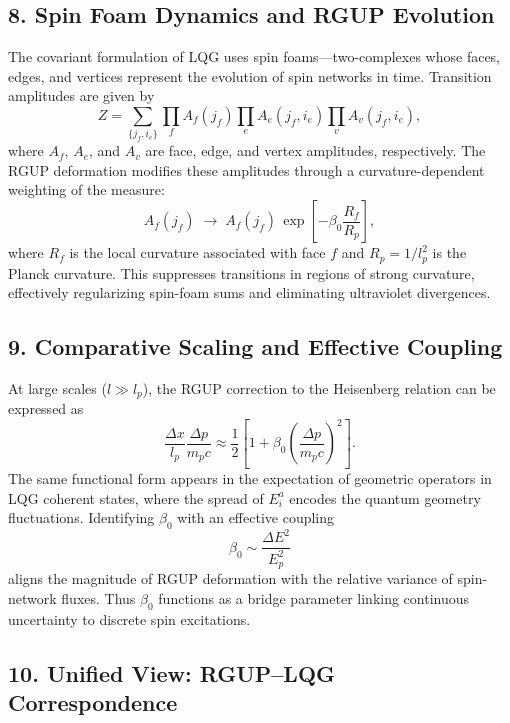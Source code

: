 \documentclass[11pt,oneside]{book}
\numberwithin{equation}{chapter}
\begin{document}
\subsection*{8. Spin Foam Dynamics and RGUP Evolution}

The covariant formulation of LQG uses spin foams—two-complexes whose faces, edges, and vertices represent the evolution of spin networks in time.  
Transition amplitudes are given by
\begin{equation}
Z = \sum_{\{j_f, i_e\}}
\prod_f A_f(j_f)
\prod_e A_e(j_f,i_e)
\prod_v A_v(j_f,i_e),
\end{equation}
where $A_f$, $A_e$, and $A_v$ are face, edge, and vertex amplitudes, respectively.  
The RGUP deformation modifies these amplitudes through a curvature-dependent weighting of the measure:
\begin{equation}
A_f(j_f) \;\rightarrow\;
A_f(j_f)\,
\exp\!\left[
-\beta_0 \frac{R_f}{R_p}
\right],
\end{equation}
where $R_f$ is the local curvature associated with face $f$ and $R_p=1/l_p^2$ is the Planck curvature.  
This suppresses transitions in regions of strong curvature, effectively regularizing spin-foam sums and eliminating ultraviolet divergences.

\subsection*{9. Comparative Scaling and Effective Coupling}

At large scales ($l \gg l_p$), the RGUP correction to the Heisenberg relation can be expressed as
\begin{equation}
\frac{\Delta x}{l_p}
\frac{\Delta p}{m_p c}
\approx
\frac{1}{2}
\left[
1 + \beta_0
\left(\frac{\Delta p}{m_p c}\right)^2
\right].
\end{equation}
The same functional form appears in the expectation of geometric operators in LQG coherent states, where the spread of $E^a_i$ encodes the quantum geometry fluctuations.  
Identifying $\beta_0$ with an effective coupling
\begin{equation}
\beta_0 \sim \frac{\Delta E^2}{E_p^2}
\end{equation}
aligns the magnitude of RGUP deformation with the relative variance of spin-network fluxes.  
Thus $\beta_0$ functions as a bridge parameter linking continuous uncertainty to discrete spin excitations.

\subsection*{10. Unified View: RGUP–LQG Correspondence}
\end{document}
